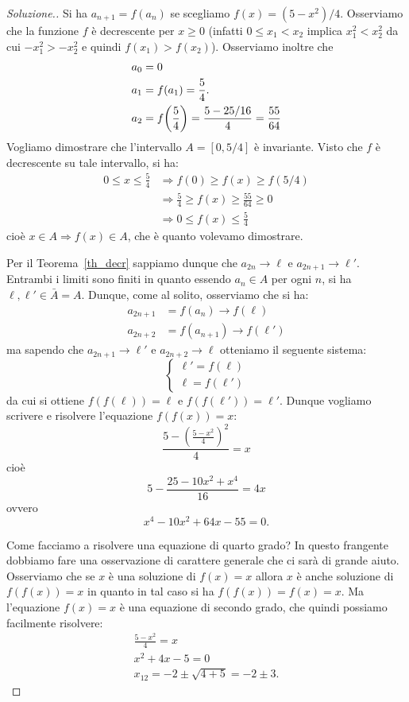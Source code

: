 \begin{proof}[Soluzione.]
Si ha $a_{n+1} = f(a_n)$ se scegliamo $f(x) = (5-x^2)/4$. Osserviamo
che la funzione $f$ è decrescente per $x \ge 0$ (infatti $0 \le x_1 <
x_2$ implica $x_1^2 < x_2^2$ da cui $-x_1^2 > -x_2^2$ e quindi $f(x_1)
> f(x_2)$). Osserviamo inoltre che
\begin{align*}
a_0 &= 0\\
a_1 &= f(a_1) = \frac 5 4.\\
a_2 &= f{\left( \frac 5 4 \right)} = \frac{5-25/16}{4} = \frac{55}{64}
\end{align*}
Vogliamo dimostrare che l'intervallo $A=[0,5/4]$ è invariante. Visto
che $f$ è decrescente su tale intervallo, si ha:
\begin{align*}
0 \le x \le \frac 5 4 &\Rightarrow f(0) \ge f(x) \ge f(5/4)\\
&\Rightarrow \frac 5 4 \ge f(x) \ge \frac{55}{64} \ge 0\\
&\Rightarrow 0 \le f(x) \le \frac 5 4
\end{align*}
cioè $x\in A \Rightarrow f(x)\in A$, che è quanto volevamo dimostrare.

Per il Teorema~\ref{th_decr} sappiamo dunque che $a_{2n} \to \ell$ e
$a_{2n+1} \to \ell'$. Entrambi i limiti sono finiti in quanto essendo
$a_n \in A$ per ogni $n$, si ha $\ell, \ell' \in \bar A = A$.
Dunque, come al solito, osserviamo che si ha:
\begin{align*}
  a_{2n+1} &= f(a_n) \to f(\ell)  \\
  a_{2n+2} &= f(a_{n+1}) \to f(\ell')
\end{align*}
ma sapendo che $a_{2n+1}\to \ell'$ e $a_{2n+2}\to \ell$ otteniamo il
seguente sistema:
\[
\begin{cases}
  \ell' = f(\ell)\\
  \ell = f(\ell')
\end{cases}
\]
da cui si ottiene $f(f(\ell))=\ell$ e $f(f(\ell'))=\ell'$. Dunque
vogliamo scrivere e risolvere l'equazione $f(f(x))=x$:
\[
\frac{5-\left(\frac{5-x^2}{4}\right)^2}{4} = x
\]
cioè
\[
5 - \frac{25 - 10x^2 + x^4}{16} = 4x
\]
ovvero
\[
x^4 - 10 x^2 + 64 x - 55 = 0.
\]

Come facciamo a risolvere una equazione di quarto grado?
In questo frangente dobbiamo fare una osservazione di carattere
generale che ci sarà di grande aiuto.
Osserviamo che se $x$ è una soluzione di $f(x)=x$ allora $x$
è anche soluzione di $f(f(x)) = x$ in quanto in tal caso si ha
$f(f(x))=f(x)=x$.
Ma l'equazione $f(x) = x$ è una equazione di secondo grado, che quindi
possiamo facilmente risolvere:
\begin{gather*}
  \frac{5-x^2}{4} = x \\
  x^2 + 4x - 5 = 0 \\
  x_{12} = -2 \pm \sqrt{4 + 5} = -2 \pm 3.
\end{gather*}


\end{proof}
